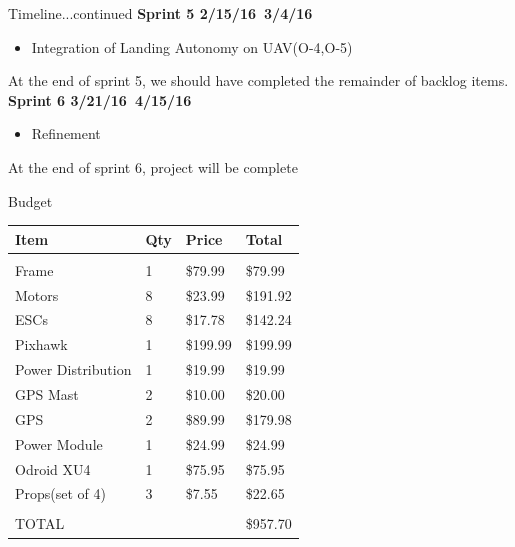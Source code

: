 \documentclass[11pt]{beamer}
\begin{document}
\begin{frame}{Timeline...continued}
\textbf{Sprint 5 2/15/16~3/4/16}
\begin{itemize}
\item Integration of Landing Autonomy on UAV(O-4,O-5)
\end{itemize}
\vspace{2mm}
At the end of sprint 5, we should have completed the remainder of backlog items.\\
\vspace{4mm}
\textbf{Sprint 6 3/21/16~4/15/16}
\begin{itemize}
\item Refinement
\end{itemize}
\vspace{2mm}
At the end of sprint 6, project will be complete
\end{frame}

\begin{frame}{Budget}
\begin{table}[]
\centering
\begin{tabular}{|l|l|l|l|}
\hline
Item               & Qty & Price    & Total    \\ \hline
                   &     &          &          \\ \hline
Frame              & 1   & \$79.99  & \$79.99  \\ \hline
Motors             & 8   & \$23.99  & \$191.92 \\ \hline
ESCs               & 8   & \$17.78  & \$142.24 \\ \hline
Pixhawk            & 1   & \$199.99 & \$199.99 \\ \hline
Power Distribution & 1   & \$19.99  & \$19.99  \\ \hline
GPS Mast           & 2   & \$10.00  & \$20.00  \\ \hline
GPS                & 2   & \$89.99  & \$179.98 \\ \hline
Power Module       & 1   & \$24.99  & \$24.99  \\ \hline
Odroid XU4         & 1   & \$75.95  & \$75.95  \\ \hline
Props(set of 4)    & 3   & \$7.55   & \$22.65  \\ \hline
                   &     &          &          \\ \hline
TOTAL              &     &          & \$957.70 \\ \hline
\end{tabular}
\end{table}


\end{frame}
\end{document}
